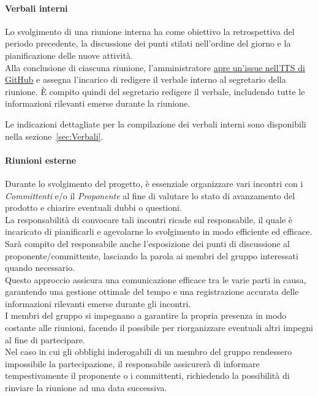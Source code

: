 \hypertarget{par:verbaliInterni}{\paragraph*{Verbali interni}}
Lo svolgimento di una riunione interna ha come obiettivo la retrospettiva del periodo precedente, la discussione dei punti stilati nell'ordine del giorno e la pianificazione delle nuove attività. \\
Alla conclusione di ciascuna riunione, l'amministratore \hyperlink{par:ticketing}{apre un'issue nell'ITS di GitHub} e assegna l'incarico di redigere il verbale interno al segretario della riunione. È compito quindi del segretario redigere il verbale, includendo tutte le informazioni rilevanti emerse durante la riunione.

Le indicazioni dettagliate per la compilazione dei verbali interni sono disponibili nella sezione~\ref{sec:Verbali}.

\paragraph{Riunioni esterne}
Durante lo svolgimento del progetto, è essenziale organizzare vari incontri con i \textit{Committenti} e/o il \textit{Proponente} al fine di valutare lo stato di avanzamento del prodotto e chiarire eventuali dubbi o questioni. \\
La responsabilità di convocare tali incontri ricade sul responsabile, il quale è incaricato di pianificarli e agevolarne lo svolgimento in modo efficiente ed efficace. \\
Sarà compito del responsabile anche l'esposizione dei punti di discussione al proponente/committente, lasciando la parola ai membri del gruppo interessati quando necessario. \\
Questo approccio assicura una comunicazione efficace tra le varie parti in causa, garantendo una gestione ottimale del tempo e una registrazione accurata delle informazioni rilevanti emerse durante gli incontri.\\
I membri del gruppo si impegnano a garantire la propria presenza in modo costante alle riunioni, facendo il possibile per riorganizzare eventuali altri impegni al fine di partecipare. \\
Nel caso in cui gli obblighi inderogabili di un membro del gruppo rendessero impossibile la partecipazione, il responsabile assicurerà di informare tempestivamente il proponente o i committenti, richiedendo la possibilità di rinviare la riunione ad una data successiva.

